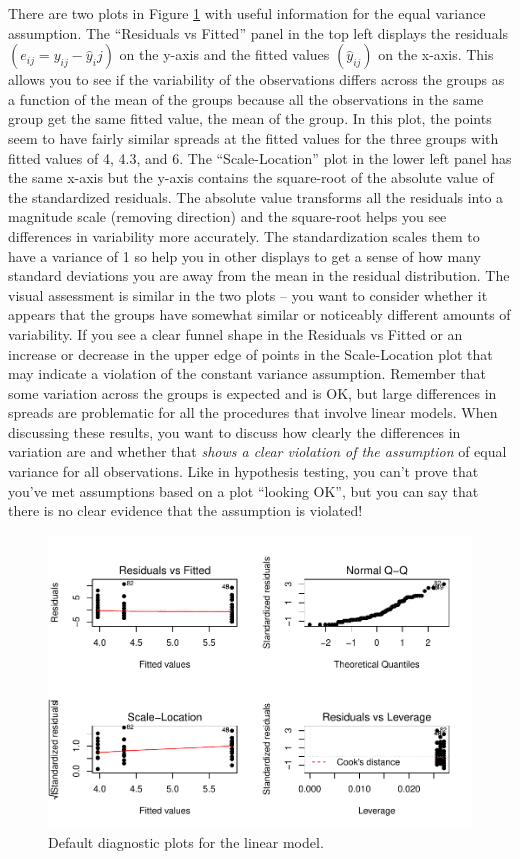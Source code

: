 \documentclass[]{book}
\theoremstyle{definition}
\theoremstyle{definition}
\theoremstyle{remark}
\begin{document}
There are two plots in Figure \ref{fig:Figure3-9} with useful
information for the equal variance assumption. The ``Residuals vs
Fitted'' panel in the top left displays the residuals
\((e_{ij} = y_{ij}-\hat{y}_ij)\) on the y-axis and the fitted values
\((\hat{y}_{ij})\) on the x-axis. This allows you to see if the
variability of the observations differs across the groups as a function
of the mean of the groups because all the observations in the same group
get the same fitted value, the mean of the group. In this plot, the
points seem to have fairly similar spreads at the fitted values for the
three groups with fitted values of 4, 4.3, and 6. The ``Scale-Location''
plot in the lower left panel has the same x-axis but the y-axis contains
the square-root of the absolute value of the standardized residuals. The
absolute value transforms all the residuals into a magnitude scale
(removing direction) and the square-root helps you see differences in
variability more accurately. The standardization scales them to have a
variance of 1 so help you in other displays to get a sense of how many
standard deviations you are away from the mean in the residual
distribution. The visual assessment is similar in the two plots -- you
want to consider whether it appears that the groups have somewhat
similar or noticeably different amounts of variability. If you see a
clear funnel shape in the Residuals vs Fitted or an increase or decrease
in the upper edge of points in the Scale-Location plot that may indicate
a violation of the constant variance assumption. Remember that some
variation across the groups is expected and is OK, but large differences
in spreads are problematic for all the procedures that involve linear
models. When discussing these results, you want to discuss how clearly
the differences in variation are and whether that \emph{shows a clear
violation of the assumption} of equal variance for all observations.
Like in hypothesis testing, you can't prove that you've met assumptions
based on a plot ``looking OK'', but you can say that there is no clear
evidence that the assumption is violated!



\begin{figure}
\centering
\includegraphics{03-oneWayAnova_files/figure-latex/Figure3-9-1.pdf}
\caption{\label{fig:Figure3-9}Default diagnostic plots for the linear model.}
\end{figure}
\end{document}
